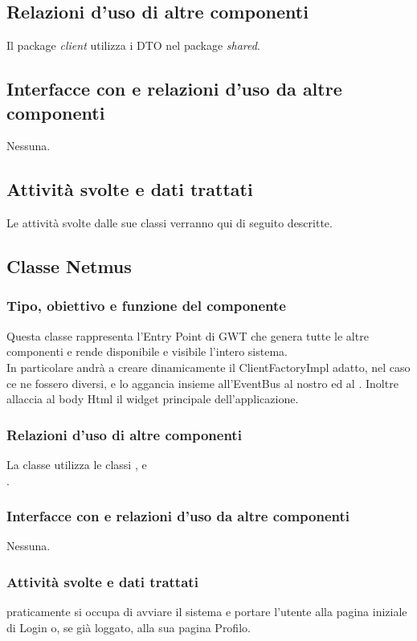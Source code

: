 \subsection*{Relazioni d'uso di altre componenti}
Il package \emph{client} utilizza i DTO nel package \emph{shared}.

\subsection*{Interfacce con e relazioni d'uso da altre componenti}
Nessuna.

\subsection*{Attivit\`a svolte e dati trattati}
Le attivit\`a svolte dalle sue classi verranno qui di seguito descritte.

\subsection{Classe Netmus}
\subsubsection*{Tipo, obiettivo e funzione del componente}
Questa classe rappresenta l'Entry Point di GWT che genera tutte le altre
componenti e rende disponibile e visibile l'intero sistema.\\
In particolare andr\`a a creare dinamicamente il ClientFactoryImpl adatto, nel
caso ce ne fossero diversi, e lo aggancia insieme all'EventBus al nostro
 ed al .
Inoltre allaccia al body Html il widget principale dell'applicazione.

\subsubsection*{Relazioni d'uso di altre componenti}
La classe  utilizza le classi ,
 e \\.

\subsubsection*{Interfacce con e relazioni d'uso da altre componenti}
Nessuna.

\subsubsection*{Attivit\`a svolte e dati trattati}
 praticamente si occupa di avviare il sistema e portare l'utente alla
pagina iniziale di Login o, se gi\`a loggato, alla sua pagina Profilo.

